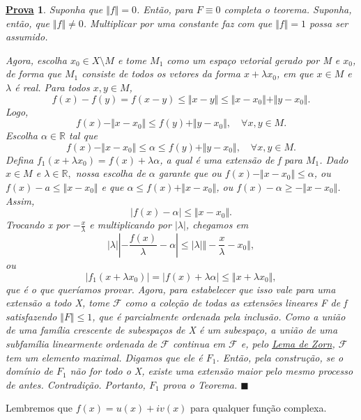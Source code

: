 \documentclass{article}
\newtheorem*{proof*}{\underline{Prova}}
\renewcommand\qedsymbol{$\blacksquare$}
\begin{document}
 \begin{proof*}
   Suponha que \(\Vert f \Vert = 0\). Então, para \(F\equiv 0\) completa o teorema. Suponha, então, que \(\Vert f \Vert\neq 0\). Multiplicar por uma constante faz com que \(\Vert f \Vert = 1\) possa ser assumido. 

   Agora, escolha \(x_{0}\in X\setminus{M}\) e tome \(M_1\) como um espaço vetorial gerado por M e \(x_{0}\), de forma que \(M_1\) consiste de todos os vetores da forma \(x+\lambda x_{0}\), em que \(x\in M\) e \(\lambda \) é real. Para todos \(x, y\in M\), 
     \[
       f(x) - f(y) = f(x-y) \leq \Vert x-y \Vert \leq \Vert x-x_{0} \Vert + \Vert y - x_{0} \Vert.
     \]
    Logo,
      \[
        f(x)-\Vert x-x_{0} \Vert \leq f(y) + \Vert y-x_{0} \Vert,\quad \forall x, y\in M.
      \]
    Escolha \(\alpha \in \mathbb{R}\) tal que 
      \[
        f(x) - \Vert x-x_{0} \Vert \leq \alpha \leq f(y) + \Vert y-x_{0} \Vert,\quad \forall x, y\in M.
      \]
    Defina \(f_1(x+\lambda x_{0}) = f(x) + \lambda \alpha \), a qual é uma extensão de f para \(M_1\). Dado \(x\in M \) e \(\lambda \in \mathbb{R},\) nossa escolha de \(\alpha\) garante que ou \(f(x) - \Vert x - x_{0} \Vert \leq \alpha \), ou \(f(x) - a \leq \Vert x-x_{0} \Vert\) e que 
    \(\alpha \leq f(x) + \Vert x-x_{0} \Vert\), ou \(f(x) - \alpha \geq -\Vert x-x_{0} \Vert\). Assim,
      \[
        |f(x) - \alpha | \leq \Vert x-x_{0} \Vert.
      \] 
    Trocando x por \(-\frac{x}{\lambda }\) e multiplicando por \(|\lambda |\), chegamos em 
      \[
        |\lambda ||-\frac{f(x)}{\lambda }-\alpha | \leq |\lambda | \Vert -\frac{x}{\lambda }-x_{0} \Vert,
      \]
    ou 
      \[
        |f_1(x+\lambda x_{0})| = |f(x) + \lambda \alpha |\leq \Vert x + \lambda x_{0} \Vert,
      \]
    que é o que queríamos provar. Agora, para estabelecer que isso vale para uma extensão a todo X, tome \(\mathcal{F}\) como a coleção de todas as extensões lineares F de f satisfazendo \(\Vert F \Vert\leq 1\), que é parcialmente ordenada pela inclusão. 
    Como a união de uma família crescente de subespaços de X é um subespaço, a união de uma subfamília linearmente ordenada de \(\mathcal{F}\) continua em \(\mathcal{F}\) e, pelo \hyperlink{zornn}{\textit{Lema de Zorn}}, \(\mathcal{F}\) tem um elemento maximal. 
    Digamos que ele é \(F_1\). Então, pela construção, se o domínio de \(F_1\) não for todo o X, existe uma extensão maior pelo mesmo processo de antes. Contradição. Portanto, \(F_1\) prova o Teorema. \qedsymbol
 \end{proof*}
 Lembremos que \(f(x) = u(x) + iv(x)\) para qualquer função complexa.
\end{document}
